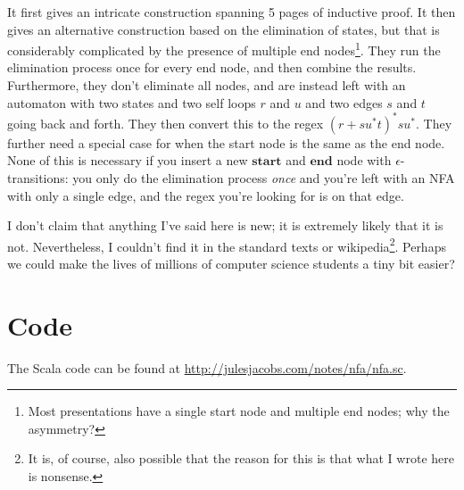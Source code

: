 \documentclass[a4paper, 11pt]{article}
\theoremstyle{definition}
\begin{document}
It first gives an intricate construction spanning 5 pages of inductive proof. It then gives an alternative construction based on the elimination of states, but that is considerably complicated by the presence of multiple end nodes\footnote{Most presentations have a single start node and multiple end nodes; why the asymmetry?}. They run the elimination process once for every end node, and then combine the results. Furthermore, they don't eliminate all nodes, and are instead left with an automaton with two states and two self loops $r$ and $u$ and two edges $s$ and $t$ going back and forth. They then convert this to the regex $(r+su^*t)^*su^*$. They further need a special case for when the start node is the same as the end node. None of this is necessary if you insert a new $\mathbf{start}$ and $\mathbf{end}$ node with $\epsilon$-transitions: you only do the elimination process \emph{once} and you're left with an NFA with only a single edge, and the regex you're looking for is on that edge.

\bigskip
\noindent I don't claim that anything I've said here is new; it is extremely likely that it is not. Nevertheless, I couldn't find it in the standard texts or wikipedia\footnote{It is, of course, also possible that the reason for this is that what I wrote here is nonsense.}. Perhaps we could make the lives of millions of computer science students a tiny bit easier?

\section{Code}

The Scala code can be found at \url{http://julesjacobs.com/notes/nfa/nfa.sc}.


\nocite{*}


\end{document}
